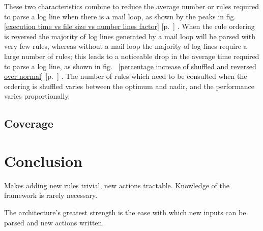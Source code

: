 \documentclass[draft]{svmult}
\newcommand{\refwithpage}[1]{%
    \empty{}\ref{#1} [p.~\pageref{#1}]%
}
\begin{document}
These two characteristics combine to reduce the average number or rules
required to parse a log line when there is a mail loop, as shown by the
peaks in fig.~\refwithpage{execution time vs file size vs number lines
factor}.  When the rule ordering is reversed the majority of log lines
generated by a mail loop will be parsed with very few rules, whereas
without a mail loop the majority of log lines require a large number of
rules; this leads to a noticeable drop in the average time required to
parse a log line, as shown in fig.~\refwithpage{percentage increase of
shuffled and reversed over normal}.  The number of rules which need to be
consulted when the ordering is shuffled varies between the optimum and
nadir, and the performance varies proportionally.



\subsection{Coverage}

\section{Conclusion}

Makes adding new rules trivial, new actions tractable.  Knowledge of the
framework is rarely necessary.

The architecture's greatest strength is the ease with which new inputs
can be parsed and new actions written.



\label{bibliography}

\renewcommand{\glossarytitle}{\section{Glossary}\label{Glossary}}
\printglossary{}

\end{document}
